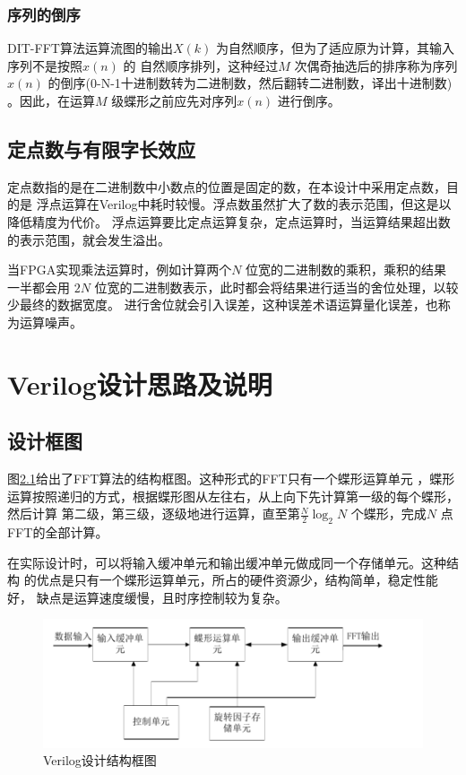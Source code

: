 \subsection{序列的倒序}%
\label{sub:xu_lie_de_dao_xu_}

DIT-FFT算法运算流图的输出$X(k)$ 为自然顺序，但为了适应原为计算，其输入序列不是按照$x(n)$ 的
自然顺序排列，这种经过$M$ 次偶奇抽选后的排序称为序列$x(n)$ 的倒序(0-N-1十进制数转为二进制数，然后翻转二进制数，译出十进制数)
。因此，在运算$M$ 级蝶形之前应先对序列$x(n)$ 进行倒序。

\section{定点数与有限字长效应}


定点数指的是在二进制数中小数点的位置是固定的数，在本设计中采用定点数，目的是
浮点运算在Verilog中耗时较慢。浮点数虽然扩大了数的表示范围，但这是以降低精度为代价。
浮点运算要比定点运算复杂，定点运算时，当运算结果超出数的表示范围，就会发生溢出。


当FPGA实现乘法运算时，例如计算两个$N$ 位宽的二进制数的乘积，乘积的结果一半都会用
$2N$ 位宽的二进制数表示，此时都会将结果进行适当的舍位处理，以较少最终的数据宽度。
进行舍位就会引入误差，这种误差术语运算量化误差，也称为运算噪声。

\chapter{Verilog设计思路及说明}

\section{设计框图}
图\ref{fig:Figure/verilog-design}给出了FFT算法的结构框图。这种形式的FFT只有一个蝶形运算单元
，蝶形运算按照递归的方式，根据蝶形图从左往右，从上向下先计算第一级的每个蝶形，然后计算
第二级，第三级，逐级地进行运算，直至第$\frac{N}{2}\log_2 N$ 个蝶形，完成$N$ 点
FFT的全部计算。

在实际设计时，可以将输入缓冲单元和输出缓冲单元做成同一个存储单元。这种结构
的优点是只有一个蝶形运算单元，所占的硬件资源少，结构简单，稳定性能好，
    缺点是运算速度缓慢，且时序控制较为复杂\cite{github}。
\begin{figure}[H]
    \centering
\includegraphics[width=0.8\linewidth]{Figure/verilog-design.png}
    \caption{Verilog设计结构框图}%
    \label{fig:Figure/verilog-design}
\end{figure}

